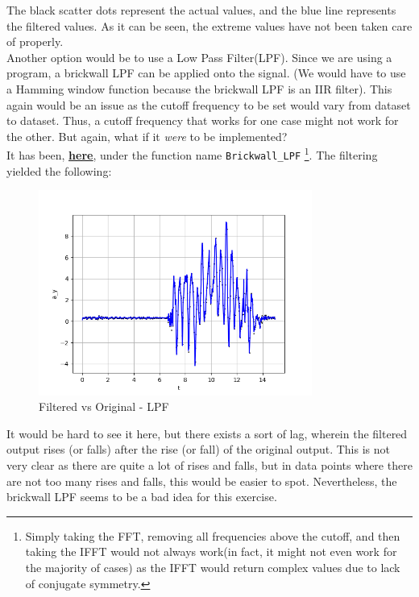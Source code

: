 \documentclass[oneside]{book}
\begin{document}
The black scatter dots represent the actual values, and the blue line represents the filtered values. As it can be seen, the extreme values have not been taken care of properly.  \\
\bigskip
Another option would be to use a Low Pass Filter(LPF). Since we are using a program, a brickwall LPF can be applied onto the signal. (We would have to use a Hamming window function because the brickwall LPF is an IIR filter). This again would be an issue as the cutoff frequency to be set would vary from dataset to dataset. Thus, a cutoff frequency that works for one case might not work for the other. But again, what if it \textit{were} to be implemented?\\
It has been, \href{https://github.com/HarryNyquist/Odometry/blob/main/Odometry_Bad_Tries/Bad_Filter_attempts.py}{\underline{\textbf{here}}}, under the function name \verb|Brickwall_LPF| \footnote{Simply taking the FFT, removing all frequencies above the cutoff, and then taking the IFFT would not always work(in fact, it might not even work for the majority of cases) as the IFFT would return complex values due to lack of conjugate symmetry.}. The filtering yielded the following:
\begin{figure}[htbp]
    \centering
    \includegraphics[width=0.8\textwidth]{figs/Filtered_using_brickwall_LPF.png}
    \caption{Filtered vs Original - LPF}
\end{figure}
It would be hard to see it here, but there exists a sort of lag, wherein the filtered output rises (or falls) after the rise (or fall) of the original output. This is not very clear as there are quite a lot of rises and falls, but in data points where there are not too many rises and falls, this would be easier to spot. Nevertheless, the brickwall LPF seems to be a bad idea for this exercise.\\
\end{document}
